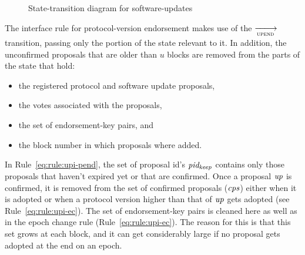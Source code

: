 \begin{figure}[ht]
  \centering

  \caption{State-transition diagram for software-updates}
  \label{fig:st-diagram-sw-up}
\end{figure}

\clearpage

The interface rule for protocol-version endorsement makes use of the
$\trans{upend}{}$ transition, passing only the portion of the state relevant
to it. In addition, the unconfirmed proposals that are older than $u$ blocks
are removed from the parts of the state that hold:
\begin{itemize}
\item the registered protocol and software update proposals,
\item the votes associated with the proposals,
\item the set of endorsement-key pairs, and
\item the block number in which proposals where added.
\end{itemize}

In Rule~\ref{eq:rule:upi-pend}, the set of proposal id's $\mathit{pid_{keep}}$
contains only those proposals that haven't expired yet or that are confirmed.
Once a proposal $\mathit{up}$ is confirmed, it is removed from the set of
confirmed proposals ($\mathit{cps}$) either when it is adopted or when a protocol
version higher than that of $\mathit{up}$ gets adopted (see
Rule~\ref{eq:rule:upi-ec}).
%
The set of endorsement-key pairs is cleaned here as well as in the epoch change
rule (Rule~\ref{eq:rule:upi-ec}). The reason for this is that this set grows at
each block, and it can get considerably large if no proposal gets adopted at
the end on an epoch.


